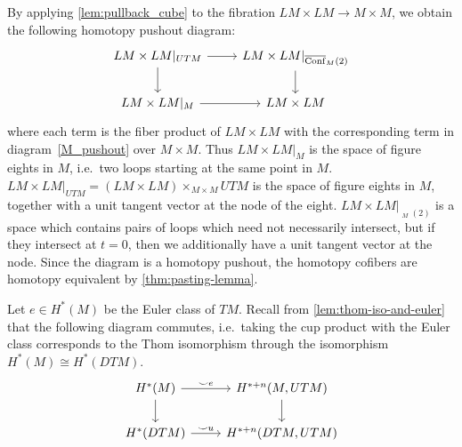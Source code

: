 \documentclass{scrartcl}
\theoremstyle{plain}
\theoremstyle{definition}
\newcommand{\cupp}{\mathbin{\smile}}
\newcommand{\iso}{\cong}
\DeclareMathOperator{\cConf}{\overline{Conf}}
\begin{document}
By applying \cref{lem:pullback_cube} to the fibration $LM\times LM\to M\times M$, we obtain the following homotopy pushout diagram:
\begin{equation}
    \begin{tikzcd}
        LM\times LM|_{UTM} \rar\dar & LM\times LM|_{\cConf_M(2)} \dar \\
        LM\times LM|_M \rar & LM\times LM
    \end{tikzcd}
\end{equation}
where each term is the fiber product of $LM\times LM$ with the corresponding term in diagram~\ref{M_pushout} over $M\times M$. Thus $LM\times LM|_M$ is the space of figure eights in $M$, i.e.\ two loops starting at the same point in $M$. $LM\times LM|_{UTM} = (LM\times LM)\times_{M\times M} UTM$ is the space of figure eights in $M$, together with a unit tangent vector at the node of the eight. $LM\times LM|_{\cConf_M(2)}$ is a space which contains pairs of loops which need not necessarily intersect, but if they intersect at $t=0$, then we additionally have a unit tangent vector at the node. Since the diagram is a homotopy pushout, the homotopy cofibers are homotopy equivalent by \cref{thm:pasting-lemma}. 

Let $e\in H^*(M)$ be the Euler class of $TM$. Recall from \cref{lem:thom-iso-and-euler} that the following diagram commutes, i.e.\ taking the cup product with the Euler class corresponds to the Thom isomorphism through the isomorphism $H^*(M)\iso H^*(DTM)$.
\[\begin{tikzcd}
    H^{*}(M) \dar \rar["\cupp e"] & H^{*+n}(M, UTM) \dar\\
    H^*(DTM) \rar["\cupp u"] & H^{*+n}(DTM, UTM)
\end{tikzcd}\]
\end{document}
